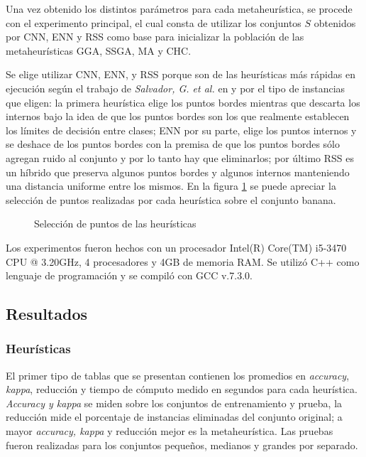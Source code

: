 Una vez obtenido los distintos parámetros para cada metaheurística, se procede con el experimento principal, el cual consta de utilizar los conjuntos $S$ obtenidos por CNN, ENN y RSS como base para inicializar la población de las metaheurísticas GGA, SSGA, MA y CHC.

Se elige utilizar CNN, ENN, y RSS porque son de las heurísticas más rápidas en ejecución según el trabajo de \emph{Salvador, G. et al.} en \cite{garcia2012prototype} y por el tipo de instancias que eligen: la primera heurística elige los puntos bordes mientras que descarta los internos bajo la idea de que los puntos bordes son los que realmente establecen los límites de decisión entre clases; ENN por su parte, elige los puntos internos y se deshace de los puntos bordes con la premisa de que los puntos bordes sólo agregan ruido al conjunto y por lo tanto hay que eliminarlos; por último RSS es un híbrido que preserva algunos puntos bordes y algunos internos manteniendo una distancia uniforme entre los mismos. En la figura \ref{heu} se puede apreciar la selección de puntos realizadas por cada heurística sobre el conjunto banana.

\begin{figure}[]

	\centering

\caption{Selección de puntos de las heurísticas}
\label{heu}
\end{figure}

Los experimentos fueron hechos con un procesador Intel(R) Core(TM) i5-3470 CPU @ 3.20GHz, 4 procesadores y 4GB de memoria RAM. Se utilizó C++ como lenguaje de programación y se compiló con GCC v.7.3.0.

\subsection{Resultados}

\subsubsection{Heurísticas}

El primer tipo de tablas que se presentan contienen los promedios en \emph{accuracy}, \emph{kappa}, reducción y tiempo de cómputo medido en segundos para cada heurística. \emph{Accuracy y kappa} se miden sobre los conjuntos de entrenamiento y prueba, la reducción mide el porcentaje de instancias eliminadas del conjunto original; a mayor \emph{accuracy, kappa} y reducción mejor es la metaheurística. Las pruebas fueron realizadas para los conjuntos pequeños, medianos y grandes por separado.

